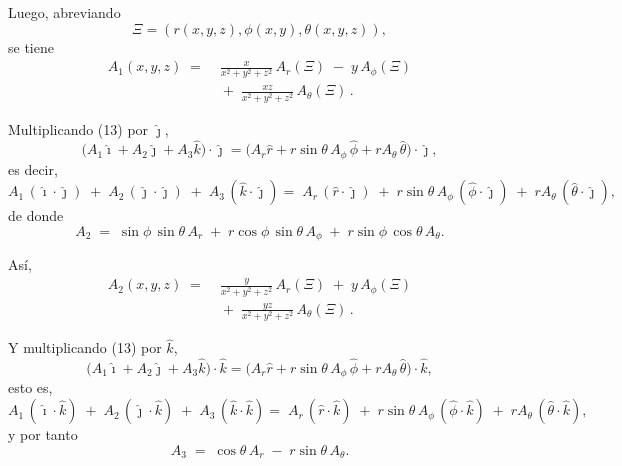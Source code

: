 \documentclass[../apunte_mecanica_clasica.tex]{subfiles}%
\begin{document}
\begin{itemize}
Luego, abreviando
\begin{equation*}
\Xi=(r(x,y,z),\phi(x,y),\theta(x,y,z)),
\end{equation*}
se tiene
\begin{equation*}
\begin{aligned}
A_1(x,y,z) \;=&\; \frac{x}{x^2+y^2+z^2}\,A_r(\Xi)
\;-\; y\,A_\phi(\Xi)\\[4pt]
&\;+\; \frac{xz}{x^2+y^2+z^2}\,A_\theta(\Xi)\,.
\end{aligned}
\end{equation*}

Multiplicando (13) por $\hat{\jmath}$,
\begin{equation*}
\big(A_1\hat{\imath}+A_2\hat{\jmath}+A_3\hat{k}\big)\cdot\hat{\jmath}
=\big(A_r\hat{r}+r\sin\theta\,A_\phi\,\hat{\phi}+rA_\theta\,\hat{\theta}\big)\cdot\hat{\jmath},
\end{equation*}
es decir,
\begin{equation*}
A_1\,(\hat{\imath}\!\cdot\!\hat{\jmath}) \;+\; A_2\,(\hat{\jmath}\!\cdot\!\hat{\jmath}) \;+\; A_3\,(\hat{k}\!\cdot\!\hat{\jmath})
=\; A_r\,(\hat{r}\!\cdot\!\hat{\jmath}) \;+\; r\sin\theta\,A_\phi\,(\hat{\phi}\!\cdot\!\hat{\jmath})
\;+\; rA_\theta\,(\hat{\theta}\!\cdot\!\hat{\jmath}),
\end{equation*}
de donde
\begin{equation*}
A_2 \;=\; \sin\phi\,\sin\theta\,A_r \;+\; r\cos\phi\,\sin\theta\,A_\phi \;+\; r\sin\phi\,\cos\theta\,A_\theta.
\end{equation*}

Así,
\begin{equation*}
\begin{aligned}
A_2(x,y,z) \;=&\; \frac{y}{x^2+y^2+z^2}\,A_r(\Xi)
\;+\; y\,A_\phi(\Xi)\\[4pt]
&\;+\; \frac{yz}{x^2+y^2+z^2}\,A_\theta(\Xi)\,.
\end{aligned}
\end{equation*}

Y multiplicando (13) por $\hat{k}$,
\begin{equation*}
\big(A_1\hat{\imath}+A_2\hat{\jmath}+A_3\hat{k}\big)\cdot\hat{k}
=\big(A_r\hat{r}+r\sin\theta\,A_\phi\,\hat{\phi}+rA_\theta\,\hat{\theta}\big)\cdot\hat{k},
\end{equation*}
esto es,
\begin{equation*}
A_1\,(\hat{\imath}\!\cdot\!\hat{k}) \;+\; A_2\,(\hat{\jmath}\!\cdot\!\hat{k}) \;+\; A_3\,(\hat{k}\!\cdot\!\hat{k})
=\; A_r\,(\hat{r}\!\cdot\!\hat{k}) \;+\; r\sin\theta\,A_\phi\,(\hat{\phi}\!\cdot\!\hat{k})
\;+\; rA_\theta\,(\hat{\theta}\!\cdot\!\hat{k}),
\end{equation*}
y por tanto
\begin{equation*}
A_3 \;=\; \cos\theta\,A_r \;-\; r\sin\theta\,A_\theta.
\end{equation*}


\end{itemize}
\end{document}
